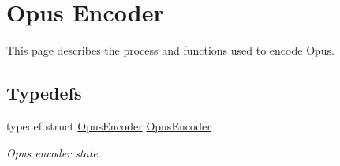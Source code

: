 \hypertarget{group__opus__encoder}{
\section{Opus Encoder}
\label{group__opus__encoder}
}


This page describes the process and functions used to encode Opus.  
\subsection*{Typedefs}
\begin{DoxyCompactItemize}
\item 
typedef struct \hyperlink{group__opus__encoder_gaf461a3ef2f10c2fe8b994a176f06c9bd}{OpusEncoder} \hyperlink{group__opus__encoder_gaf461a3ef2f10c2fe8b994a176f06c9bd}{OpusEncoder}
\begin{DoxyCompactList}\small\item\em Opus encoder state. \item\end{DoxyCompactList}\end{DoxyCompactItemize}
